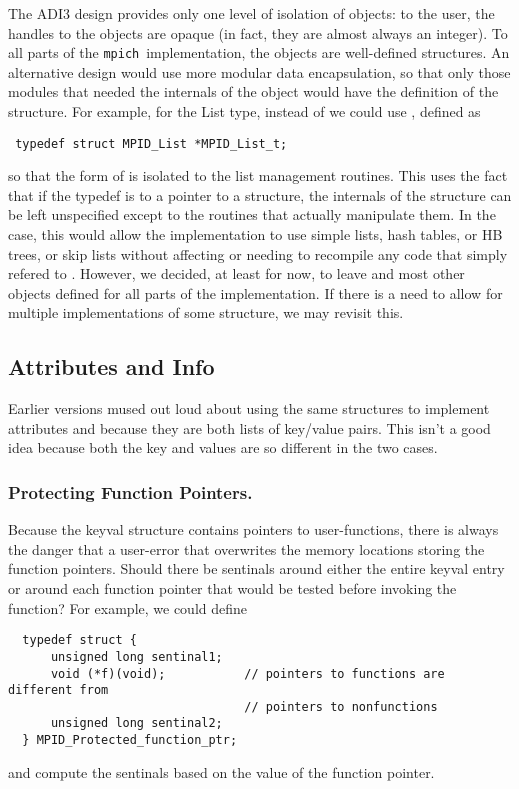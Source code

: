 \documentclass{article}
\newcommand{\mpich}{\texttt{mpich}}
\begin{document}
The ADI3 design provides only one level of isolation of objects: to
the user, the handles to the objects are opaque (in fact, they are
almost always an integer).  To all parts of the \mpich\ implementation,
the objects are well-defined structures.  An alternative design would
use more modular data encapsulation, so that only those modules that
needed the internals of the object would have the definition of the
structure.  For example, for the List type, instead of  we could use , defined as
\begin{verbatim}
 typedef struct MPID_List *MPID_List_t;
\end{verbatim}
so that the form of  is isolated to the list
management routines.
This uses the fact that if the typedef is to a pointer to a structure,
the internals of the 
structure can be left unspecified except to the routines that actually 
manipulate them.  In the  case, this would allow the
implementation 
to use simple lists, hash tables, or HB trees, or skip lists without 
affecting or needing to recompile any code that simply refered to
. 
However, we decided, at least for now, to leave  and
most other objects defined for all parts of the implementation.  If
there is a need to allow for multiple implementations of some
structure, we may revisit this.  

\subsection{Attributes and Info}
Earlier versions mused out loud about using the same structures to
implement attributes and  because they are both lists
of key/value pairs.  This isn't a good idea because both the key and
values are so different in the two cases.

\subsubsection{Protecting Function Pointers.}
  Because the keyval structure contains pointers to user-functions,
  there is always 
  the danger that a user-error that overwrites the memory locations storing 
  the function pointers.  Should there be sentinals around either the entire
  keyval entry or around each function pointer that would be tested before 
  invoking the function?  
  For example, we could define
\begin{verbatim}
  typedef struct { 
      unsigned long sentinal1;
      void (*f)(void);           // pointers to functions are different from
                                 // pointers to nonfunctions 
      unsigned long sentinal2;
  } MPID_Protected_function_ptr;
\end{verbatim}
  and compute the sentinals based on the value of the function pointer.
\end{document}
